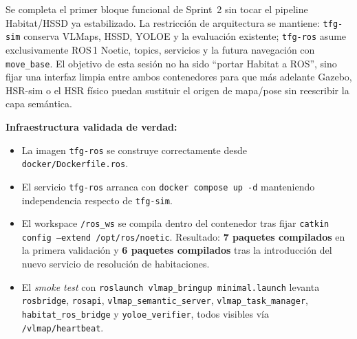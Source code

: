 \documentclass[11pt,a4paper]{article}
\begin{document}
Se completa el primer bloque funcional de Sprint~2 sin tocar el pipeline
Habitat/HSSD ya estabilizado. La restricción de arquitectura se mantiene:
\texttt{tfg-sim} conserva VLMaps, HSSD, YOLOE y la evaluación existente;
\texttt{tfg-ros} asume exclusivamente ROS\,1 Noetic, topics, servicios y
la futura navegación con \texttt{move\_base}. El objetivo de esta sesión no
ha sido ``portar Habitat a ROS'', sino fijar una interfaz limpia entre ambos
contenedores para que más adelante Gazebo, HSR-sim o el HSR físico puedan
sustituir el origen de mapa/pose sin reescribir la capa semántica.

\textbf{Infraestructura validada de verdad:}
\begin{itemize}
  \item La imagen \texttt{tfg-ros} se construye correctamente desde
        \texttt{docker/Dockerfile.ros}.
  \item El servicio \texttt{tfg-ros} arranca con \texttt{docker compose up -d}
        manteniendo independencia respecto de \texttt{tfg-sim}.
  \item El workspace \texttt{/ros\_ws} se compila dentro del contenedor tras
        fijar \texttt{catkin config --extend /opt/ros/noetic}. Resultado:
        \textbf{7 paquetes compilados} en la primera validación y
        \textbf{6 paquetes compilados} tras la introducción del nuevo servicio
        de resolución de habitaciones.
  \item El \emph{smoke test} con \texttt{roslaunch vlmap\_bringup minimal.launch}
        levanta \texttt{rosbridge}, \texttt{rosapi}, \texttt{vlmap\_semantic\_server},
        \texttt{vlmap\_task\_manager}, \texttt{habitat\_ros\_bridge} y
        \texttt{yoloe\_verifier}, todos visibles vía
        \texttt{/vlmap/heartbeat}.
\end{itemize}
\end{document}
